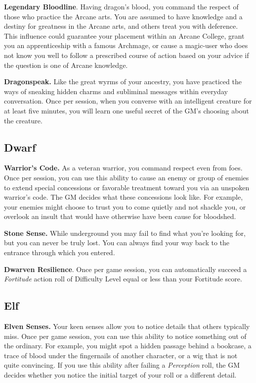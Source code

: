 \documentclass[12pt]{report}
\begin{document}
\textbf{Legendary Bloodline}. Having dragon's blood, you command the
respect of those who practice the Arcane arts. You are assumed to have
knowledge and a destiny for greatness in the Arcane arts, and others
treat you with deference. This influence could guarantee your placement
within an Arcane College, grant you an apprenticeship with a famous
Archmage, or cause a magic-user who does not know you well to follow a
prescribed course of action based on your advice if the question is one
of Arcane knowledge.

\textbf{Dragonspeak.} Like the great wyrms of your ancestry, you have
practiced the ways of sneaking hidden charms and subliminal messages
within everyday conversation. Once per session, when you converse with
an intelligent creature for at least five minutes, you will learn one
useful secret of the GM's choosing about the creature.

\subsection{Dwarf}\label{dwarf}

\textbf{Warrior's Code.} As a veteran warrior, you command respect even
from foes. Once per session, you can use this ability to cause an enemy
or group of enemies to extend special concessions or favorable treatment
toward you via an unspoken warrior's code. The GM decides what these
concessions look like. For example, your enemies might choose to trust
you to come quietly and not shackle you, or overlook an insult that
would have otherwise have been cause for bloodshed.

\textbf{Stone Sense.} While underground you may fail to find what you're
looking for, but you can never be truly lost. You can always find your
way back to the entrance through which you entered.

\textbf{Dwarven Resilience}. Once per game session, you can
automatically succeed a \emph{Fortitude} action roll of Difficulty Level
equal or less than your Fortitude score.

\subsection{Elf}\label{elf}

\textbf{Elven Senses.} Your keen senses allow you to notice details that
others typically miss. Once per game session, you can use this ability
to notice something out of the ordinary. For example, you might spot a
hidden passage behind a bookcase, a trace of blood under the fingernails
of another character, or a wig that is not quite convincing. If you use
this ability after failing a \emph{Perception} roll, the GM decides
whether you notice the initial target of your roll or a different
detail.
\end{document}
